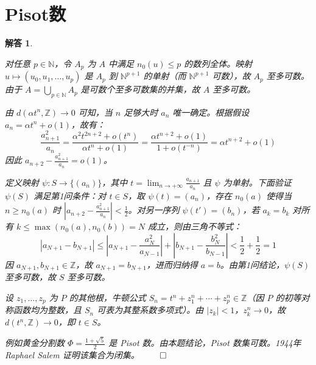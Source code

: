\documentclass[12pt,UTF8]{ctexbook}
\theoremstyle{exercisestyle}
\theoremstyle{solutionstyle}
\newtheorem*{solution*}{解答}
\newenvironment{solution}
  {\begin{solution*}}
  {\hfill\ensuremath{\qed}\end{solution*}}
\begin{document}
\section{Pisot数}
\begin{solution}
  \begin{subquestions}
    \item 对任意 $p \in \mathbb{N}$，令 $A_p$ 为 $A$ 中满足 $n_0(u) \leq p$ 的数列全体。映射 $u \mapsto (u_0, u_1, \ldots, u_p)$ 是 $A_p$ 到 $\mathbb{N}^{p+1}$ 的单射（而 $\mathbb{N}^{p+1}$ 可数），故 $A_p$ 至多可数。由于 $A = \bigcup_{p \in \mathbb{N}} A_p$ 是可数个至多可数集的并集，故 $A$ 至多可数。
    
    \item 由 $d(\alpha t^n, \mathbb{Z}) \to 0$ 可知，当 $n$ 足够大时 $a_n$ 唯一确定。根据假设 $a_n = \alpha t^n + o(1)$，故有：
    $$
    \frac{a_{n+1}^2}{a_n} = \frac{\alpha^2 t^{2n+2} + o(t^n)}{\alpha t^n + o(1)} = \frac{\alpha t^{n+2} + o(1)}{1 + o(t^{-n})} = \alpha t^{n+2} + o(1)
    $$
    因此 $a_{n+2} - \frac{a_{n+1}^2}{a_n} = o(1)$。

    定义映射 $\psi: S \to \{(a_n)\}$，其中 $t = \lim_{n \to +\infty} \frac{a_{n+1}}{a_n}$ 且 $\psi$ 为单射。下面验证 $\psi(S)$ 满足第1问条件：对 $t \in S$，取 $\psi(t) = (a_n)$，存在 $n_0(a)$ 使得当 $n \geq n_0(a)$ 时 $\left| a_{n+2} - \frac{a_{n+1}^2}{a_n} \right| < \frac{1}{2}$。对另一序列 $\psi(t') = (b_n)$，若 $a_k = b_k$ 对所有 $k \leq \max(n_0(a), n_0(b)) = N$ 成立，则由三角不等式：
    $$
    |a_{N+1} - b_{N+1}| \leq \left|a_{N+1} - \frac{a_N^2}{a_{N-1}}\right| + \left|b_{N+1} - \frac{b_N^2}{b_{N-1}}\right| < \frac{1}{2} + \frac{1}{2} = 1
    $$
    因 $a_{N+1}, b_{N+1} \in \mathbb{Z}$，故 $a_{N+1} = b_{N+1}$，进而归纳得 $a = b$。由第1问结论，$\psi(S)$ 至多可数，故 $S$ 至多可数。

    \item 设 $z_1, \ldots, z_p$ 为 $P$ 的其他根，牛顿公式 $S_n = t^n + z_1^n + \cdots + z_p^n \in \mathbb{Z}$（因 $P$ 的初等对称函数均为整数，且 $S_n$ 可表为其整系数多项式）。由 $|z_k| < 1$，$z_k^n \to 0$，故 $d(t^n, \mathbb{Z}) \to 0$，即 $t \in S$。
  \end{subquestions}
  例如黄金分割数 $\Phi = \frac{1+\sqrt{5}}{2}$ 是 Pisot 数。由本题结论，Pisot 数集可数。1944年 Raphael Salem 证明该集合为闭集。
\end{solution}
\end{document}
